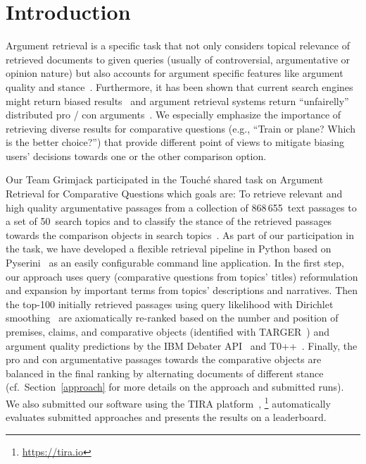 
\section{Introduction}\label{intro}

Argument retrieval is a specific task that not only considers topical relevance of retrieved documents to given queries (usually of controversial, argumentative or opinion nature) but also accounts for argument specific features like argument quality and stance~\cite{BondarenkoFBGAPBSWPH2020, BondarenkoGFBAPBSWPH2021}.  
Furthermore, it has been shown that current search engines might return biased results~\cite{ShahB2022} and argument retrieval systems return ``unfairelly'' distributed pro / con arguments~\cite{CherumanalSSC2021}.
We especially emphasize the importance of retrieving diverse results for comparative questions (e.g., ``Train or plane? Which is the better choice?'') that provide different point of views to mitigate biasing users' decisions towards one or the other comparison option.

Our Team Grimjack participated in the Touch{\'e} shared task on Argument Retrieval for Comparative Questions which goals are: \Ni To retrieve relevant and high quality argumentative passages from a collection of 868\,655~text passages to a set of 50~search topics and \Nii to classify the stance of the retrieved passages towards the comparison objects in search topics~\cite{BondarenkoFKSGBPBSWPH2022}.
As part of our participation in the task, we have developed a flexible retrieval pipeline in Python based on Pyserini~\cite{LinMLYPN2021} as an easily configurable command line application.
In the first step, our approach uses query (comparative questions from topics' titles) reformulation and expansion by important terms from topics' descriptions and narratives. Then the top-100 initially retrieved passages using query likelihood with Dirichlet smoothing~\cite{ZhaiL2001} are axiomatically re-ranked based on the number and position of premises, claims, and comparative objects (identified with TARGER~\cite{ChernodubOHBHBP2019}) and argument quality predictions by the IBM Debater API~\cite{ToledoGCFVLJAS2019} and T0++~\cite{SanhWRBSACSLRDBXTSSKCNDCJWMSYPBWNRSSFFTBGBWR2021}.
Finally, the pro and con argumentative passages towards the comparative objects are balanced in the final ranking by alternating documents of different stance (cf.\ Section~\ref{approach} for more details on the approach and submitted runs). We also submitted our software using the TIRA platform~\cite{PotthastGWS2019},%
\footnote{\url{https://tira.io}} automatically evaluates submitted approaches and presents the results on a leaderboard.%

